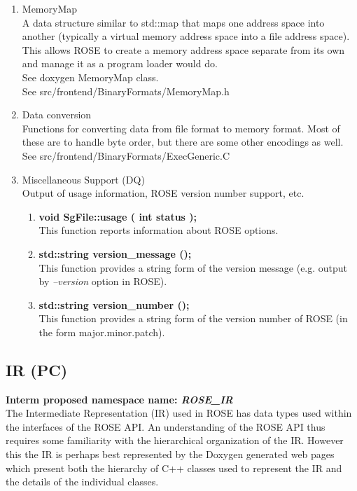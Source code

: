 \begin{enumerate}
   \item MemoryMap \\
   A data structure similar to std::map that maps one address
   space into another (typically a virtual memory address space
   into a file address space).  This allows ROSE to create a
   memory address space separate from its own and manage it as a
   program loader would do. \\
   See doxygen MemoryMap class. \\
   See src/frontend/BinaryFormats/MemoryMap.h

   \item Data conversion \\
   Functions for converting data from file format to memory
   format. Most of these are to handle byte order, but there are
   some other encodings as well. \\
   See src/frontend/BinaryFormats/ExecGeneric.C

   \item Miscellaneous Support (DQ) \\
         Output of usage information, ROSE version number support, etc.
   \begin{enumerate}
      \item {\bf void SgFile::usage ( int status );} \\
      This function reports information about ROSE options.
      \item {\bf std::string version\_message ();} \\
      This function provides a string form of the version message 
      (e.g. output by {\em --version} option in ROSE).
      \item {\bf std::string version\_number ();} \\
      This function provides a string form of the version number of ROSE
      (in the form major.minor.patch).
   \end{enumerate}

\end{enumerate}


\subsection{IR (PC)}
{\bf Interm proposed namespace name: {\em ROSE\_IR}} \\
   The Intermediate Representation (IR) used in ROSE has data types used
within the interfaces of the ROSE API.  An understanding of the ROSE API 
thus requires some familiarity with the hierarchical organization of the 
IR.  However this the IR is perhaps best represented by the Doxygen
generated web pages which present both the hierarchy of C++ classes 
used to represent the IR and the details of the individual classes.


